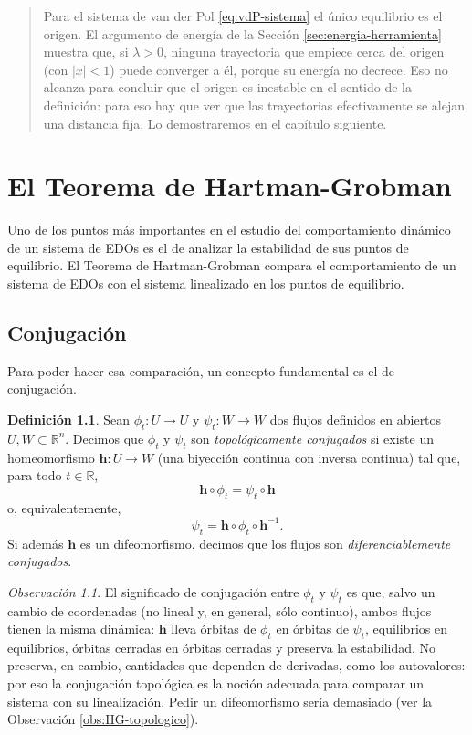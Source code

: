 \documentclass[12pt, a4paper]{amsbook}
\newcommand{\R}{{\mathbb R}}
\newcommand{\hh}{{\mathbf h}}
\theoremstyle{remark}
\newtheorem{obs}[teo]{Observación}
\theoremstyle{definition}
\newtheorem{defi}[teo]{Definición}
\numberwithin{section}{chapter}
\numberwithin{subsection}{section}
\numberwithin{equation}{section}
\numberwithin{figure}{chapter}
\newenvironment{volvemos}[1]{\medskip\par\noindent\begin{quote}\noindent{\bf Volvemos al problema: #1.}\par\smallskip}{\end{quote}\medskip}
\begin{document}
\begin{volvemos}{el circuito}
Para el sistema de van der Pol \eqref{eq:vdP-sistema} el único equilibrio es el origen. El argumento de energía de la Sección \ref{sec:energia-herramienta} muestra que, si $\lambda>0$, ninguna trayectoria que empiece cerca del origen (con $|x|<1$) puede converger a él, porque su energía no decrece. Eso no alcanza para concluir que el origen es inestable en el sentido de la definición: para eso hay que ver que las trayectorias efectivamente se alejan una distancia fija. Lo demostraremos en el capítulo siguiente.
\end{volvemos}

\chapter{El Teorema de Hartman-Grobman}\label{cap:HG}

Uno de los puntos más importantes en el estudio del comportamiento dinámico de un sistema de EDOs es el de analizar la estabilidad de sus puntos de equilibrio. El Teorema de Hartman-Grobman compara el comportamiento de un sistema de EDOs con el sistema linealizado en los puntos de equilibrio. 


\section{Conjugación}
Para poder hacer esa comparación, un concepto fundamental es el de conjugación.

\begin{defi}
Sean $\phi_t\colon U\to U$ y $\psi_t\colon W\to W$ dos flujos definidos en abiertos $U,W\subset\R^n$. Decimos que $\phi_t$ y $\psi_t$ son \emph{topológicamente conjugados} si existe un homeomorfismo $\hh\colon U\to W$ (una biyección continua con inversa continua) tal que, para todo $t\in \R$,
$$
\hh\circ \phi_t = \psi_t \circ \hh
$$
o, equivalentemente,
$$
\psi_t = \hh\circ \phi_t\circ \hh^{-1}.
$$
Si además $\hh$ es un difeomorfismo, decimos que los flujos son \emph{diferenciablemente conjugados}.
\end{defi}

\begin{obs}
El significado de conjugación entre $\phi_t$ y $\psi_t$ es que, salvo un cambio de coordenadas (no lineal y, en general, sólo continuo), ambos flujos tienen la misma dinámica: $\hh$ lleva órbitas de $\phi_t$ en órbitas de $\psi_t$, equilibrios en equilibrios, órbitas cerradas en órbitas cerradas y preserva la estabilidad. No preserva, en cambio, cantidades que dependen de derivadas, como los autovalores: por eso la conjugación topológica es la noción adecuada para comparar un sistema con su linealización. Pedir un difeomorfismo sería demasiado (ver la Observación \ref{obs:HG-topologico}).
\end{obs}
\end{document}
